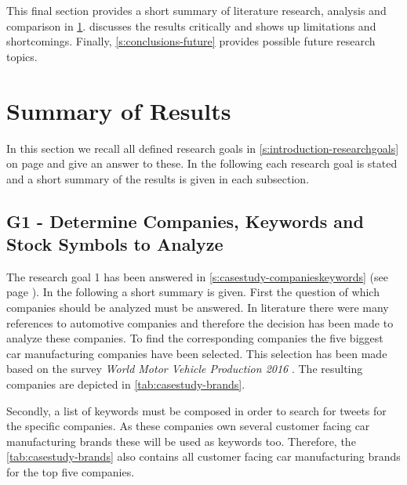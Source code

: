 This final section provides a short summary of literature research, analysis and comparison in \cref{s:conclusions-summary}.
 discusses the results critically and shows up limitations and shortcomings. 
Finally, \cref{s:conclusions-future} provides possible future research topics.

\section{Summary of Results}
\label{s:conclusions-summary}

In this section we recall all defined research goals in \cref{s:introduction-researchgoals} on page \pageref{s:introduction-researchgoals} and give an answer to these.
In the following each research goal is stated and a short summary of the results is given in each subsection.


\subsection{G1 - Determine Companies, Keywords and Stock Symbols to Analyze}
\label{ss:conclusion-summary-g1}

The research goal 1 has been answered in \cref{s:casestudy-companieskeywords} (see page \pageref{s:casestudy-companieskeywords}).
In the following a short summary is given.
First the question of which companies should be analyzed must be answered.
In literature there were many references to automotive companies and therefore the decision has been made to analyze these companies.
To find the corresponding companies the five biggest car manufacturing companies have been selected.
This selection has been made based on the survey \emph{World Motor Vehicle Production 2016} \citep{OICA2016}. 
The resulting companies are depicted in \cref{tab:casestudy-brands}.

Secondly, a list of keywords must be composed in order to search for tweets for the specific companies.
As these companies own several customer facing car manufacturing brands these will be used as keywords too.
Therefore, the \cref{tab:casestudy-brands} also contains all customer facing car manufacturing brands for the top five companies.


